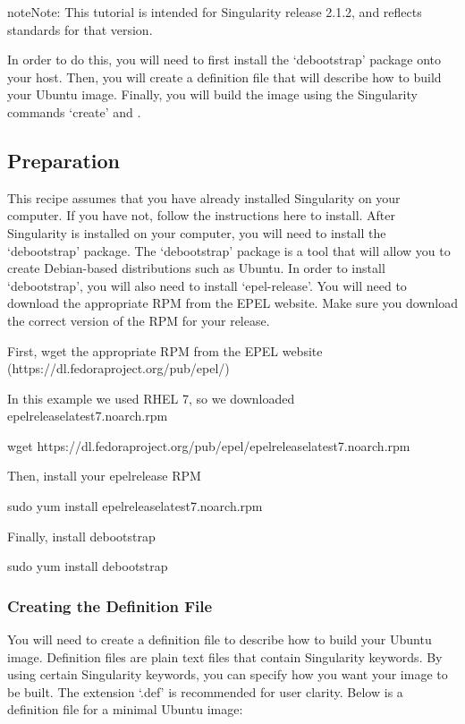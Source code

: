 \documentclass[letterpaper,10pt,english]{sphinxmanual}
\begin{document}
\begin{sphinxadmonition}{note}{Note:}
This tutorial is intended for Singularity release 2.1.2,
and reflects standards for that version.
\end{sphinxadmonition}

In order to do this, you will need to first install the ‘debootstrap’ package onto your host. Then, you will create
a definition file that will describe how to build your Ubuntu image. Finally, you will build the image using the Singularity
commands ‘create’ and .


\subsection{Preparation}
\label{\detokenize{appendix:preparation}}
This recipe assumes that you have already installed Singularity on your computer. If you have not, follow the instructions here
to install. After Singularity is installed on your computer, you will need to install the ‘debootstrap’ package. The ‘debootstrap’
package is a tool that will allow you to create Debian-based distributions such as Ubuntu. In order to install ‘debootstrap’, you will
also need to install ‘epel-release’. You will need to download the appropriate RPM from the EPEL website. Make sure you download the correct
version of the RPM for your release.

%
\begin{sphinxVerbatim}[commandchars=\\\{\}]
\PYGZsh{} First, wget the appropriate RPM from the EPEL website (https://dl.fedoraproject.org/pub/epel/)

\PYGZsh{} In this example we used RHEL 7, so we downloaded epel\PYGZhy{}release\PYGZhy{}latest\PYGZhy{}7.noarch.rpm

\PYGZdl{} wget https://dl.fedoraproject.org/pub/epel/epel\PYGZhy{}release\PYGZhy{}latest\PYGZhy{}7.noarch.rpm


\PYGZsh{} Then, install your epel\PYGZhy{}release RPM

\PYGZdl{} sudo yum install epel\PYGZhy{}release\PYGZhy{}latest\PYGZhy{}7.noarch.rpm


\PYGZsh{} Finally, install debootstrap

\PYGZdl{} sudo yum install debootstrap
\end{sphinxVerbatim}


\subsubsection{Creating the Definition File}
\label{\detokenize{appendix:creating-the-definition-file}}
You will need to create a definition file to describe how to build your Ubuntu image. Definition files are plain text files that contain Singularity
keywords. By using certain Singularity keywords, you can specify how you want your image to be built. The extension ‘.def’ is recommended for user clarity.
Below is a definition file for a minimal Ubuntu image:
\end{document}
